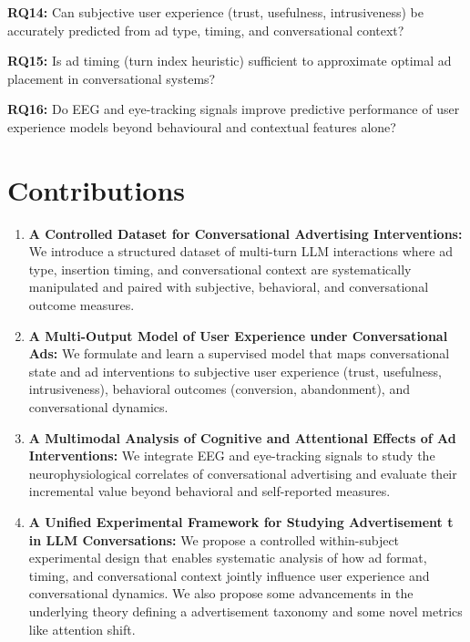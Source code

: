 \documentclass{article}
\begin{document}
\textbf{RQ14:} Can subjective user experience (trust, usefulness, intrusiveness) be accurately predicted from ad type, timing, and conversational context?

\textbf{RQ15:} Is ad timing (turn index heuristic) sufficient to approximate optimal ad placement in conversational systems?

\textbf{RQ16:} Do EEG and eye-tracking signals improve predictive performance of user experience models beyond behavioural and contextual features alone?

\newpage

\section{Contributions}
\label{Contributions}

\begin{enumerate}

\item \textbf{A Controlled Dataset for Conversational Advertising Interventions:}  
We introduce a structured dataset of multi-turn LLM interactions where ad type, insertion timing, and conversational context are systematically manipulated and paired with subjective, behavioral, and conversational outcome measures.

\vspace{0.2cm}

\item \textbf{A Multi-Output Model of User Experience under Conversational Ads:}  
We formulate and learn a supervised model that maps conversational state and ad interventions to subjective user experience (trust, usefulness, intrusiveness), behavioral outcomes (conversion, abandonment), and conversational dynamics.

\vspace{0.2cm}

\item \textbf{A Multimodal Analysis of Cognitive and Attentional Effects of Ad Interventions:}  
We integrate EEG and eye-tracking signals to study the neurophysiological correlates of conversational advertising and evaluate their incremental value beyond behavioral and self-reported measures.

\vspace{0.2cm}

\item \textbf{A Unified Experimental Framework for Studying Advertisement t in LLM Conversations:}  
We propose a controlled within-subject experimental design that enables systematic analysis of how ad format, timing, and conversational context jointly influence user experience and conversational dynamics. We also propose some advancements in the underlying theory defining a advertisement taxonomy and some novel metrics like attention shift.

\end{enumerate}
\end{document}
